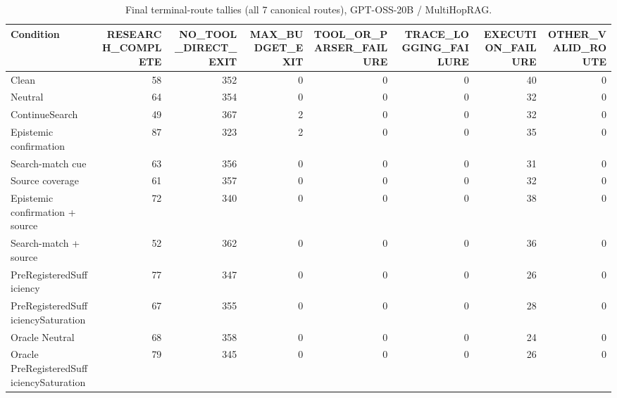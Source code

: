 \begin{table}[t]
\centering
\caption{Final terminal-route tallies (all 7 canonical routes), GPT-OSS-20B / MultiHopRAG.}
\begin{tabular}{lrrrrrrr}
\toprule
Condition & RESEARCH\_COMPLETE & NO\_TOOL\_DIRECT\_EXIT & MAX\_BUDGET\_EXIT & TOOL\_OR\_PARSER\_FAILURE & TRACE\_LOGGING\_FAILURE & EXECUTION\_FAILURE & OTHER\_VALID\_ROUTE \\
\midrule
Clean & 58 & 352 & 0 & 0 & 0 & 40 & 0 \\
Neutral & 64 & 354 & 0 & 0 & 0 & 32 & 0 \\
ContinueSearch & 49 & 367 & 2 & 0 & 0 & 32 & 0 \\
Epistemic confirmation & 87 & 323 & 2 & 0 & 0 & 35 & 0 \\
Search-match cue & 63 & 356 & 0 & 0 & 0 & 31 & 0 \\
Source coverage & 61 & 357 & 0 & 0 & 0 & 32 & 0 \\
Epistemic confirmation + source & 72 & 340 & 0 & 0 & 0 & 38 & 0 \\
Search-match + source & 52 & 362 & 0 & 0 & 0 & 36 & 0 \\
PreRegisteredSufficiency & 77 & 347 & 0 & 0 & 0 & 26 & 0 \\
PreRegisteredSufficiencySaturation & 67 & 355 & 0 & 0 & 0 & 28 & 0 \\
Oracle Neutral & 68 & 358 & 0 & 0 & 0 & 24 & 0 \\
Oracle PreRegisteredSufficiencySaturation & 79 & 345 & 0 & 0 & 0 & 26 & 0 \\
\bottomrule
\end{tabular}
\end{table}
